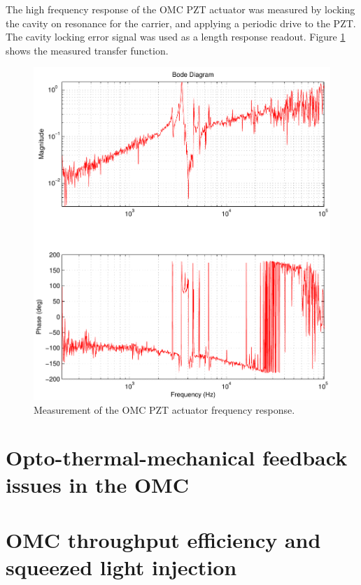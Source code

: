The high frequency response of the OMC PZT actuator was measured by locking the cavity on resonance for the carrier, and applying a periodic drive to the PZT. %
The cavity locking error signal was used as a length response readout. %
Figure \ref{fig:pzttf} shows the measured transfer function.

\begin{figure}
  \begin{center}
  \leavevmode
  \includegraphics{figs-omc/pzttf.pdf}
  \end{center}
  \caption[Measurement of the OMC PZT actuator frequency response.]{Measurement of the OMC PZT actuator frequency response. }
  \label{fig:pzttf}
\end{figure}


\section{Opto-thermal-mechanical feedback issues in the OMC}


\section{OMC throughput efficiency and squeezed light injection}
